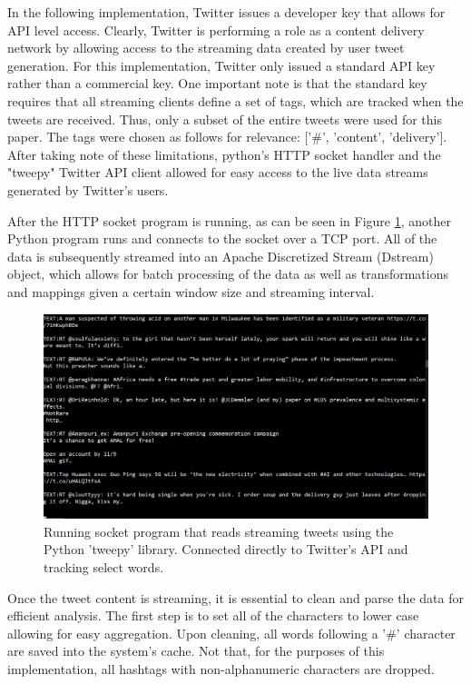 \documentclass[conference]{IEEEtran}
\begin{document}
In the following implementation, Twitter issues a developer key that allows for API level access. Clearly, Twitter is performing a role as a content delivery network by allowing access to the streaming data created by user tweet generation. For this implementation, Twitter only issued a standard API key rather than a commercial key. One important note is that the standard key requires that all streaming clients define a set of tags, which are tracked when the tweets are received. Thus, only a subset of the entire tweets were used for this paper. The tags were chosen as follows for relevance: ['\#', 'content', 'delivery']. After taking note of these limitations, python's HTTP socket handler and the "tweepy" Twitter API client allowed for easy access to the live data streams generated by Twitter's users. \par

After the HTTP socket program is running, as can be seen in Figure \ref{fig:http_client}, another Python program runs and connects to the socket over a TCP port. All of the data is subsequently streamed into an Apache Discretized Stream (Dstream) object, which allows for batch processing of the data as well as transformations and mappings given a certain window size and streaming interval. \par

\begin{figure}
    \centering
    \includegraphics[scale=0.35]{img/http_client.PNG}
    \caption{Running socket program that reads streaming tweets using the Python 'tweepy' library. Connected directly to Twitter's API and tracking select words.}
    \label{fig:http_client}
\end{figure}

Once the tweet content is streaming, it is essential to clean and parse the data for efficient analysis. The first step is to set all of the characters to lower case allowing for easy aggregation. Upon cleaning, all words following a '\#' character are saved into the system's cache. Not that, for the purposes of this implementation, all hashtags with non-alphanumeric characters are dropped. \par
\end{document}
